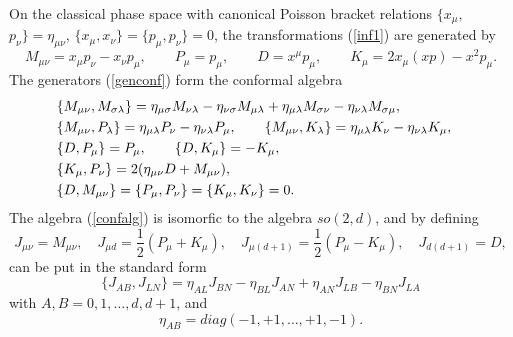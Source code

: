 \documentclass[a4paper,12pt]{article}
\begin{document}
On the classical phase space with
canonical Poisson bracket relations
$\{x_\mu,$ $p_\nu\}=\eta_{\mu\nu}$,
$\{x_\mu,x_\nu\}=\{p_\mu,p_\nu\}=0$,
the transformations
(\ref{inf1}) are generated by
\begin{equation}
M_{\mu \nu } = x_{\mu }p_{\nu }-x_{\nu }p_{ \mu }, \qquad
P_{\mu } = p_{\mu },\qquad
D = x^{\mu }p_{\mu }, \qquad
K_{\mu } = 2x_{\mu }(xp)-x^{2}p_{\mu }.
\label{genconf}
\end{equation}
The generators (\ref{genconf})
form the conformal algebra
\begin{eqnarray}
&\{M_{\mu\nu},M_{\sigma\lambda}\}=
\eta_{\mu\sigma}M_{\nu\lambda}-
\eta_{\nu\sigma}M_{\mu\lambda}+
\eta_{\mu\lambda}M_{\sigma\nu}-
\eta_{\nu\lambda}M_{\sigma\mu},&\notag\\
&\{M_{\mu \nu },P_{\lambda }\} =
\eta_{\mu \lambda }P_{ \nu }-
\eta_{\nu\lambda }P_{\mu },\qquad
\{M_{\mu \nu },K_{\lambda }\} =
\eta_{\mu \lambda }K_{ \nu }-
\eta_{\nu\lambda }K_{\mu },&\notag\\
&\{D, P_{\mu }\} =P_{\mu },\qquad
\{D, K_{\mu }\} =-K_{\mu },&\notag\\
&\{ K_{\mu },P_{\nu }\} =
2(\eta_{\mu \nu }D+M_{\mu \nu}),&
\notag \\
&\{D, M_{\mu\nu}\} =
\{P_\mu,P_\nu\}=
\{ K_{\mu },K_{\nu }\} =0.&
\label{confalg}
\end{eqnarray}
The algebra (\ref{confalg})
is isomorfic to the algebra $so(2,d)$, and
by defining
\begin{equation}
J_{\mu \nu }=M_{\mu \nu },\quad
 J_{\mu d}=\frac{1}{2}(P_\mu + K_\mu),\quad
 J_{\mu (d+1)}=\frac{1}{2}(P_\mu-K_\mu),
 \quad
 J_{d(d+1)}=D,
 \label{ident}
\end{equation}
can be put in the standard form
\begin{equation}
\{J_{AB},J_{LN}\}=
\eta_{AL}J_{BN}-
\eta_{BL}J_{AN}+
\eta_{AN}J_{LB}-
\eta_{BN}J_{LA}
\label{so24}
\end{equation}
with $A,B=0,1,\ldots, d,d+1$, and
\begin{equation}
\eta_{AB}=diag (-1,+1,\ldots,+1,-1).
\label{etaab}
\end{equation}
\end{document}
